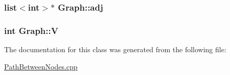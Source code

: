 \subsubsection[{\texorpdfstring{adj}{adj}}]{\setlength{\rightskip}{0pt plus 5cm}list$<$int$>$$\ast$ Graph\+::adj\hspace{0.3cm}{\ttfamily [private]}}\hypertarget{classGraph_a04ab9c17ad31aa036def8db0f88b035b}{}\label{classGraph_a04ab9c17ad31aa036def8db0f88b035b}
\subsubsection[{\texorpdfstring{V}{V}}]{\setlength{\rightskip}{0pt plus 5cm}int Graph\+::V\hspace{0.3cm}{\ttfamily [private]}}\hypertarget{classGraph_a2b722f7cfa7a21e4cb5fae488b3d4dcc}{}\label{classGraph_a2b722f7cfa7a21e4cb5fae488b3d4dcc}


The documentation for this class was generated from the following file\+:\begin{DoxyCompactItemize}
\item 
\hyperlink{PathBetweenNodes_8cpp}{Path\+Between\+Nodes.\+cpp}\end{DoxyCompactItemize}
